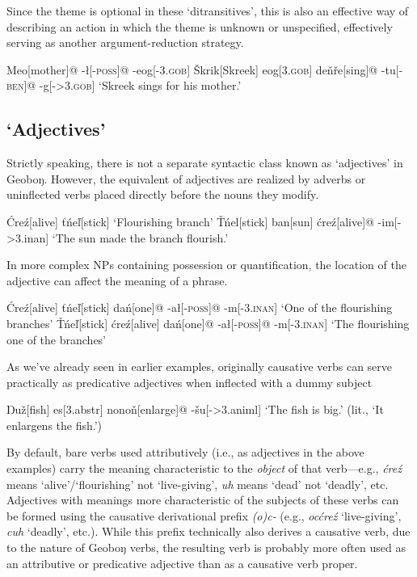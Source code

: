 \documentclass[10pt]{article}
\newcommand{\sk}{\textsc}
\newcommand{\vt}{ť}
\newcommand{\vz}{ž}
\newcommand{\vs}{š}
\newcommand{\vr}{ř}
\newcommand{\vl}{ľ}
\newcommand{\vn}{ň}
\newcommand{\vT}{Ť}
\newcommand{\vS}{Š}
\newcommand{\Engma}{Ŋ}
\newcommand{\engma}{ŋ}
\begin{document}
Since the theme is optional in these `ditransitives', this is also an effective way of describing an action in which the theme is unknown or unspecified, effectively serving as another argument-reduction strategy.

\ex
\begingl
Meo[mother]@
-\l[-\sk{poss}]@
-eog[-\sk{3.gob}]
\vS krik[Skreek]
eog[\sk{3.gob}]
de\vn\vr e[sing]@
-tu[-\sk{ben}]@
-g[-\sk{>3.gob}]
\glft `Skreek sings for his mother.'
\endgl
\xe

\subsection{`Adjectives'}

Strictly speaking, there is not a separate syntactic class known as `adjectives' in Geobo{\engma}. However, the equivalent of adjectives are realized by adverbs or uninflected verbs placed directly before the nouns they modify.

\pex
\a
\begingl
\'Cre\'z[alive]
\vt\'ne\vl[stick]
\glft  `Flourishing branch'
\endgl
\a 
\begingl
\vT\'nel[stick]
ban[sun]
\'cre\'z[alive]@
-im[\sc ->3.inan]
\glft `The sun made the branch flourish.'
\endgl
\xe

In more complex NPs containing possession or quantification, the location of the adjective can affect the meaning of a phrase.

\pex
\a
\begingl
\'Cre\'z[alive]
\vt\'ne{\vl}[stick]
da\'n[one]@
-a\l[-\sk{poss}]@
-m[-\sk{3.inan}]
\glft  `One of the flourishing branches'
\endgl
\a
\begingl
\vT\'ne{\vl}[stick]
\'cre\'z[alive]
da\'n[one]@
-a\l[-\sk{poss}]@
-m[-\sk{3.inan}]
\glft  `The flourishing one of the branches'
\endgl
\xe

As we've already seen in earlier examples, originally causative verbs can serve practically as predicative adjectives when inflected with a dummy subject

\ex
\begingl
\Engma u\vz[fish]
es[\sc 3.abstr]
nono\vn[enlarge]@
-\vs u[\sc ->3.animl]
\glft `The fish is big.' (lit., `It enlargens the fish.')
\endgl
\xe

By default, bare verbs used attributively (i.e., as adjectives in the above examples) carry the meaning characteristic to the \textit{object} of that verb---e.g., \textit{\'cre\'z} means `alive'/`flourishing' not `live-giving', \textit{uh} means `dead' not `deadly', etc. Adjectives with meanings more characteristic of the subjects of these verbs can be formed using the causative derivational prefix \textit{(o)c-} (e.g., \textit{oc\'cre\'z} `live-giving', \textit{cuh} `deadly', etc.). While this prefix technically also derives a causative verb, due to the nature of Geobo{\engma} verbs, the resulting verb is probably more often used as an attributive or predicative adjective than as a causative verb proper. 
\end{document}
